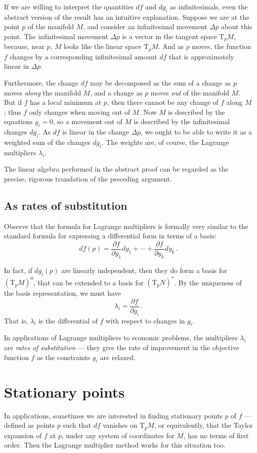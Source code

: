 \documentclass[12pt]{article}
\newcommand{\Tp}{\mathrm{T}_p}
\newcommand{\pd}[2]{\frac{\partial #1}{\partial #2}}
\begin{document}
If we are willing to interpret the quantities $df$ and $dg_i$ as infinitesimals,
even the abstract version of the result has an intuitive explanation.
Suppose we are at the point $p$ of the manifold $M$,
and consider an infinitesimal movement $\Delta p$ about this point.
The infinitesimal movement $\Delta p$ is a vector in the tangent space
$\Tp M$, because, near $p$, $M$ looks like the linear space $\Tp M$.
And as $p$ moves, the function $f$ changes by a corresponding infinitesimal amount $df$
that is approximately linear in $\Delta p$.

Furthermore, the change $df$ may be decomposed
as the sum of a change as $p$ moves \emph{along} the manifold $M$,
and a change as $p$ moves \emph{out} of the manifold $M$.  
But if $f$ has a local minimum at $p$, then there cannot be
any change of $f$ along $M$; thus $f$ only changes
when moving out of $M$.
Now $M$ is described by the equations $g_i = 0$,
so a movement out of $M$ is described by the infinitesimal changes
$dg_i$.
As $df$ is linear in the change $\Delta p$,
we ought to be able to write it as a weighted sum of the changes $dg_i$.
The weights are, of course, the Lagrange multipliers $\lambda_i$.

The linear algebra performed in the abstract proof can be regarded as the precise, rigorous
translation of the preceding argument.

\subsection{As rates of substitution}

Observe that the formula for Lagrange multipliers is formally
very similar to the standard formula for expressing
a differential form in terms of a basis:
\[
df(p) = \pd{f}{y_1} dy_1 + \dotsb + \pd{f}{y_k} dy_k\,.
\]

In fact, if $dg_i(p)$ are linearly independent,
then they do form a basis for $(\Tp M)^0$,
that can be extended to a basis for $(\Tp N)^*$.
By the uniqueness of the basis representation,
we must have
\[
\lambda_i = \pd{f}{g_i}\,.
\]
That is, $\lambda_i$ is the differential
of $f$ with respect to changes in $g_i$.

In applications of Lagrange multipliers to economic
problems, the multipliers $\lambda_i$ are \emph{rates of substitution} ---
they give the rate of improvement in the objective function $f$
as the constraints $g_i$ are relaxed.

\section{Stationary points}
In applications,
sometimes we are interested in 
finding stationary points $p$ of $f$ --- defined as 
points $p$ such that $df$ vanishes on $\Tp M$, or equivalently, 
that the Taylor expansion of $f$ at $p$, under any system of coordinates 
for $M$, has no terms of first order. Then the Lagrange multiplier method 
works for this situation too.
\end{document}
